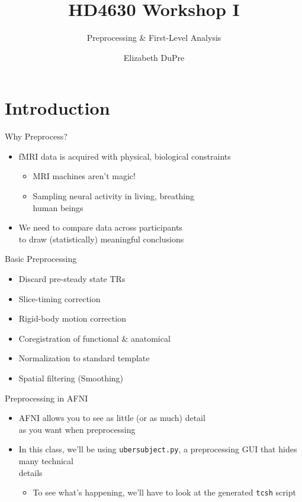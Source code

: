 \documentclass[t,12pt]{beamer}
\title{HD4630 Workshop I}
\subtitle{Preprocessing \& First-Level Analysis}
\author{Elizabeth DuPre \\[.8\baselineskip]}
\institute{Human Neuroscience Institute 
\\[4pt]
\href{http://www.human.cornell.edu/hd/}{Department of Human Development}
\\[4pt]
\href{https://www.cornell.edu/}{Cornell University}}
\date{}
\begin{document}
\begin{frame}
  \titlepage
\end{frame}

\section{Introduction}
\begin{frame}{Why Preprocess?}
\vspace{10pt}
\begin{itemize}
\setlength\itemsep{1em}
  \item fMRI data is acquired with physical, biological constraints
  \vspace{4pt}
  \begin{itemize}
  \setlength\itemsep{0.5em}
   \item MRI machines aren't magic!
   \item Sampling neural activity in living, breathing \\ human beings
  \end{itemize}
  \item We need to compare data across participants \\ to draw (statistically) meaningful conclusions
\end{itemize}
\end{frame}

\begin{frame}{Basic Preprocessing}
\vspace{10pt}
\begin{itemize}
\setlength\itemsep{1em}
\item Discard pre-steady state TRs
\item Slice-timing correction
\item Rigid-body motion correction
\item Coregistration of functional \& anatomical
\item Normalization to standard template
\item Spatial filtering (Smoothing)
\end{itemize}
\end{frame}

\begin{frame}{Preprocessing in AFNI}
\vspace{10pt}
\begin{itemize}
\setlength\itemsep{1em}
\item AFNI allows you to see as little (or as much) detail \\ as you want when preprocessing
\item In this class, we'll be using \texttt{uber\textunderscore{}subject.py}, a preprocessing GUI that hides many technical \\ details
\vspace{4pt}
\begin{itemize}
\item To see what's happening, we'll have to look at the generated \texttt{tcsh} script
\end{itemize}
\end{itemize}
\end{frame}
\end{document}
